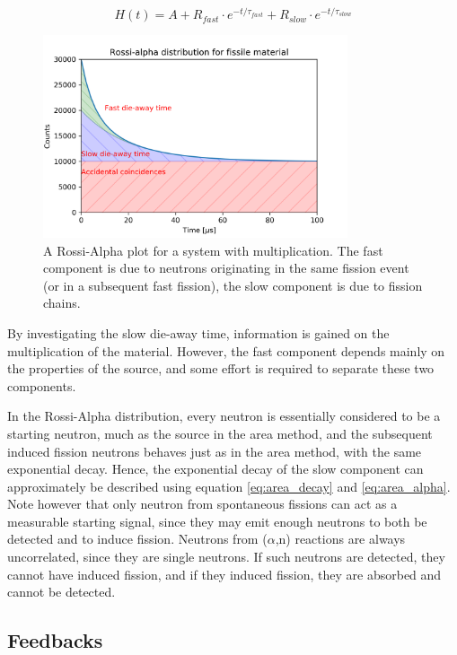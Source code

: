 \begin{equation} \label{eq:rossi_alpha}
H(t) = A + R_{fast} \cdot e^{-t/\tau_{fast}} + R_{slow} \cdot e^{-t/\tau_{slow}}
\end{equation} 

\begin{figure} 
\centering
\includegraphics[width=0.8\textwidth]{figures/04-Rossi_alpha_slow_fast.png}
\caption[Area Method]{\label{fig:rossi_alpha_plot}
A Rossi-Alpha plot for a system with multiplication. The fast component is due to neutrons originating in the same fission event (or in a subsequent fast fission), the slow component is due to fission chains.}
\end{figure}

By investigating the slow die-away time, information is gained on the multiplication of the material. However, the fast component depends mainly on the properties of the source, and some effort is required to separate these two components. 

In the Rossi-Alpha distribution, every neutron is essentially considered to be a starting neutron, much as the source in the area method, and the subsequent induced fission neutrons behaves just as in the area method, with the same exponential decay. Hence, the exponential decay of the slow component can approximately be described using equation \ref{eq:area_decay} and \ref{eq:area_alpha}. Note however that only neutron from spontaneous fissions can act as a measurable starting signal, since they may emit enough neutrons to both be detected and to induce fission. Neutrons from ($\alpha$,n) reactions are always uncorrelated, since they are single neutrons. If such neutrons are detected, they cannot have induced fission, and if they induced fission, they are absorbed and cannot be detected. 

\subsection{Feedbacks}


